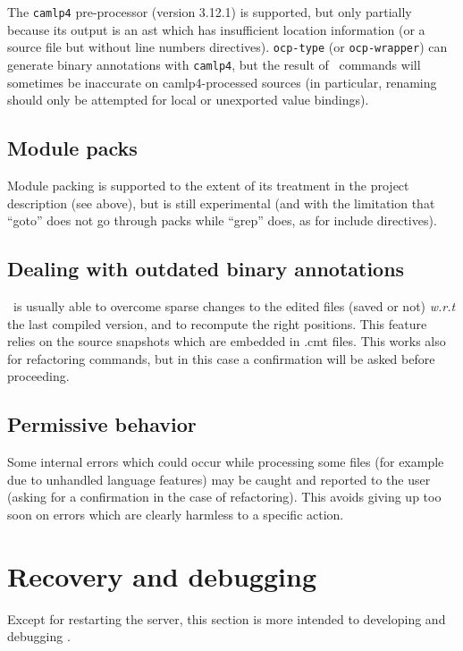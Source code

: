 The \verb!camlp4! pre-processor (version 3.12.1) is supported, but
only partially because its output is an ast which has insufficient
location information (or a source file but without line numbers
directives).  \verb!ocp-type! (or \verb!ocp-wrapper!) can generate
binary annotations with \verb!camlp4!, but the result of \typerex\
commands will sometimes be inaccurate on camlp4-processed sources (in
particular, renaming should only be attempted for local or unexported
value bindings).

\subsection{Module packs}

Module packing is supported to the extent of its treatment in the
project description (see above), but is still experimental (and with
the limitation that ``goto'' does not go through packs while ``grep''
does, as for include directives).

\subsection{Dealing with outdated binary annotations}

\typerex\ is usually able to overcome sparse changes to the edited
files (saved or not) \emph{w.r.t} the last compiled version, and to
recompute the right positions. This feature relies on the source
snapshots which are embedded in .cmt files. This works also for
refactoring commands, but in this case a confirmation will be asked
before proceeding.

\subsection{Permissive behavior}

Some internal errors which could occur while processing some files
(for example due to unhandled language features) may be caught and
reported to the user (asking for a confirmation in the case of
refactoring). This avoids giving up too soon on errors which are
clearly harmless to a specific action.

\section{Recovery and debugging}

Except for restarting the server, this section is more intended to
developing and debugging \typerex.

